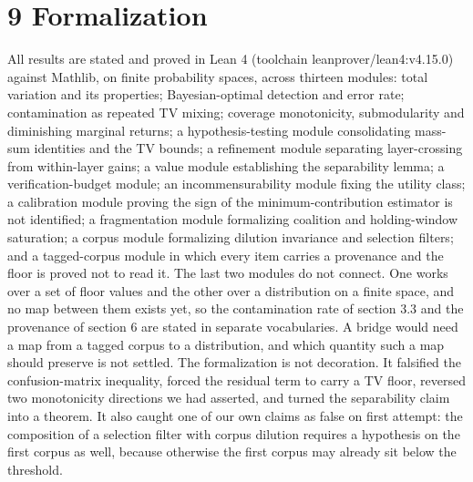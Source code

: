 \documentclass[11pt,a4paper]{article}
\theoremstyle{definition}
\theoremstyle{remark}
\begin{document}
\section*{9  Formalization}
All results are stated and proved in Lean 4 (toolchain leanprover/lean4:v4.15.0) against Mathlib, on finite probability spaces, across thirteen modules: total variation and its properties; Bayesian-optimal detection and error rate; contamination as repeated TV mixing; coverage monotonicity, submodularity and diminishing marginal returns; a hypothesis-testing module consolidating mass-sum identities and the TV bounds; a refinement module separating layer-crossing from within-layer gains; a value module establishing the separability lemma; a verification-budget module; an incommensurability module fixing the utility class; a calibration module proving the sign of the minimum-contribution estimator is not identified; a fragmentation module formalizing coalition and holding-window saturation; a corpus module formalizing dilution invariance and selection filters; and a tagged-corpus module in which every item carries a provenance and the floor is proved not to read it.
The last two modules do not connect. One works over a set of floor values and the other over a distribution on a finite space, and no map between them exists yet, so the contamination rate of section 3.3 and the provenance of section 6 are stated in separate vocabularies. A bridge would need a map from a tagged corpus to a distribution, and which quantity such a map should preserve is not settled.
The formalization is not decoration. It falsified the confusion-matrix inequality, forced the residual term to carry a TV floor, reversed two monotonicity directions we had asserted, and turned the separability claim into a theorem. It also caught one of our own claims as false on first attempt: the composition of a selection filter with corpus dilution requires a hypothesis on the first corpus as well, because otherwise the first corpus may already sit below the threshold.
\end{document}
